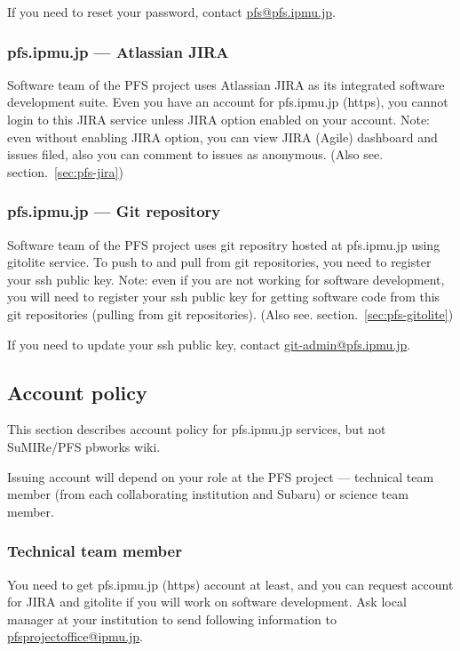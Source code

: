 \documentclass[a4paper,notitlepage]{article}
\begin{document}
If you need to reset your password, contact \url{pfs@pfs.ipmu.jp}. 

\subsubsection{pfs.ipmu.jp --- Atlassian JIRA}

Software team of the PFS project uses Atlassian JIRA as its integrated 
software development suite. 
Even you have an account for pfs.ipmu.jp (https), you cannot login to this 
JIRA service unless JIRA option enabled on your account. 
Note: even without enabling JIRA option, you can view JIRA (Agile) dashboard 
and issues filed, also you can comment to issues as anonymous. 
(Also see. section.~\ref{sec:pfs-jira})

\subsubsection{pfs.ipmu.jp --- Git repository}

Software team of the PFS project uses git repositry hosted at pfs.ipmu.jp 
using gitolite service. To push to and pull from git repositories, you 
need to register your ssh public key. 
Note: even if you are not working for software development, you will need 
to register your ssh public key for getting software code from this 
git repositories (pulling from git repositories). 
(Also see. section.~\ref{sec:pfs-gitolite})

If you need to update your ssh public key, contact \url{git-admin@pfs.ipmu.jp}.

\subsection{Account policy}

This section describes account policy for pfs.ipmu.jp services, but not 
SuMIRe/PFS pbworks wiki. 

Issuing account will depend on your role at the PFS project --- 
technical team member (from each collaborating institution and Subaru) 
or science team member. 

\subsubsection{Technical team member}

You need to get pfs.ipmu.jp (https) account at least, 
and you can request account for JIRA and gitolite if you will work on software 
development. 
Ask local manager at your institution 
to send following information to \url{pfsprojectoffice@ipmu.jp}. 
\end{document}
